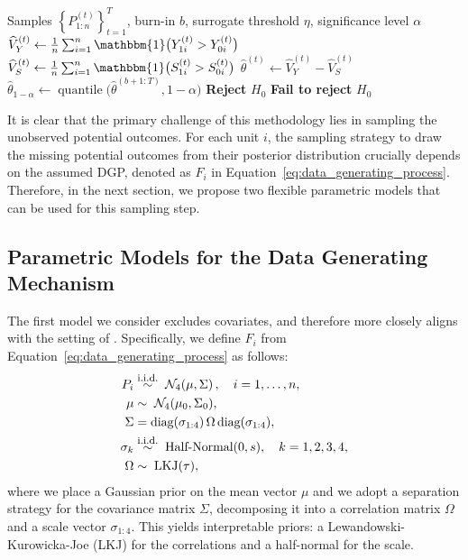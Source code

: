 \documentclass[referee,usenatbib]{biom}
\newcommand{\iid}{\overset{\text{\footnotesize i.i.d.}}{\sim}}
\newcommand{\one}{\mathbbm{1}}
\begin{document}
\begin{algorithm}[htbp!]
\caption{Bayesian Decision Rule.}
\label{alg:Bayesian_decision_rule}
\begin{algorithmic}[1]
\Require Samples \(\left\{P^{(t)}_{1:n}\right\}_{t=1}^T\), burn-in \(b\), surrogate threshold \(\eta\), significance level \(\alpha\)
    \State \(\widehat{V}_Y^{(t)} \gets \frac{1}{n} \sum_{i=1}^{n} \one \big(Y_{1i}^{(t)} > Y_{0i}^{(t)}\big)\)
    \State \(\widehat{V}_{S}^{(t)} \gets \frac{1}{n} \sum_{i=1}^{n} \one \big(S_{1i}^{(t)} > S_{0i}^{(t)}\big)\)
    \State \(\widehat{\theta}^{(t)} \gets \widehat{V}_Y^{(t)} - \widehat{V}_{S}^{(t)}\)
\EndFor
\State \(\widehat{\theta}_{1-\alpha} \gets \operatorname{quantile}\!\Big(\widehat{\theta}^{(b+1:T)}, 1-\alpha\Big)\)
    \State \textbf{Reject} \(H_0\)
\Else
    \State \textbf{Fail to reject} \(H_0\)
\EndIf
\end{algorithmic}
\end{algorithm}

It is clear that the primary challenge of this methodology lies in sampling the unobserved potential outcomes. For each unit \(i\), the sampling strategy to draw the missing potential outcomes from their posterior distribution crucially depends on the assumed DGP, denoted as \(F_{i}\) in Equation~\eqref{eq:data_generating_process}. Therefore, in the next section, we propose two flexible parametric models that can be used for this sampling step.

\subsection{Parametric Models for the Data Generating Mechanism}\label{subsection:parametric_models}

The first model we consider excludes covariates, and therefore more closely aligns with the setting of \citet{parast2024rank}. Specifically, we define \(F_{i}\) from Equation~\eqref{eq:data_generating_process} as follows:
\begin{equation}
  \label{eq:parametric_model}
  \begin{aligned}
    P_{i} & \iid \; \mathcal{N}_{4}\!\left( \mu , \Sigma \right), \quad i=1,\ldots,n, \\
    \mu & \sim \; \mathcal{N}_{4}(\mu_{0}, \Sigma_{0}), \\
    \Sigma &= \text{diag}(\sigma_{1:4}) \,\Omega\, \text{diag}(\sigma_{1:4}), \\
    \sigma_{k} &\iid \; \text{Half-Normal}(0, s), \quad k = 1,2,3,4, \\
    \Omega & \sim \; \text{LKJ}(\tau),
  \end{aligned}
\end{equation}
where we place a Gaussian prior on the mean vector \(\mu\) and we adopt a separation strategy \citep{barnard2000modeling} for the covariance matrix \(\Sigma\), decomposing it into a correlation matrix \(\Omega\) and a scale vector \(\sigma_{1:4}\). This yields interpretable priors: a Lewandowski-Kurowicka-Joe (LKJ) \citep{lewandowski2009generating} for the correlations and a half-normal for the scale.
\end{document}
